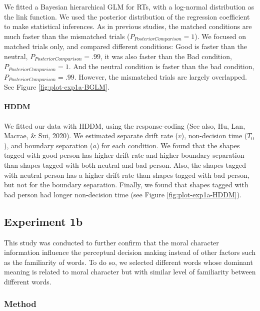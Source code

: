 \documentclass[
  english,
  man]{apa6}
\let\oldparagraph\paragraph
\renewcommand{\paragraph}[1]{\oldparagraph{#1}\mbox{}}
\begin{document}
We fitted a Bayesian hierarchical GLM for RTs, with a log-normal distribution as the link function. We used the posterior distribution of the regression coefficient to make statistical inferences. As in previous studies, the matched conditions are much faster than the mismatched trials (\(P_{PosteriorComparison} = 1\)). We focused on matched trials only, and compared different conditions: Good is faster than the neutral, \(P_{PosteriorComparison} = .99\), it was also faster than the Bad condition, \(P_{PosteriorComparison} = 1\). And the neutral condition is faster than the bad condition, \(P_{PosteriorComparison} = .99\). However, the mismatched trials are largely overlapped. See Figure \ref{fig:plot-exp1a-BGLM}.

\hypertarget{hddm}{%
\paragraph{HDDM}\label{hddm}}

We fitted our data with HDDM, using the response-coding (See also, Hu, Lan, Macrae, \& Sui, 2020). We estimated separate drift rate (\(v\)), non-decision time (\(T_{0}\)), and boundary separation (\(a\)) for each condition. We found that the shapes tagged with good person has higher drift rate and higher boundary separation than shapes tagged with both neutral and bad person. Also, the shapes tagged with neutral person has a higher drift rate than shapes tagged with bad person, but not for the boundary separation. Finally, we found that shapes tagged with bad person had longer non-decision time (see Figure \ref{fig:plot-exp1a-HDDM}).

\hypertarget{experiment-1b}{%
\subsection{Experiment 1b}\label{experiment-1b}}

This study was conducted to further confirm that the moral character information influence the perceptual decision making instead of other factors such as the familiarity of words. To do so, we selected different words whose dominant meaning is related to moral character but with similar level of familiarity between different words.

\hypertarget{method}{%
\subsubsection{Method}\label{method}}
\end{document}

